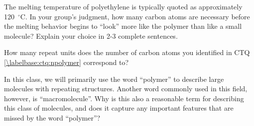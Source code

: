 \begin{activity}
\begin{ctqs}
	\question The melting temperature of polyethylene is typically quoted as approximately 120~${}^\circ$C.  In your group's judgment, how many carbon atoms are necessary before the melting behavior begins to ``look'' more like the polymer than like a small molecule?  Explain your choice in 2-3 complete sentences. \label{\labelbase:ctq:npolymer}
	
		\begin{solution}[2in]
		\end{solution}
	
	
			
\end{ctqs}

		

\begin{exercises}

	\exercise How many repeat units does the number of carbon atoms you identified in CTQ \ref{\labelbase:ctq:npolymer} correspond to?

	\exercise In this class, we will primarily use the word ``polymer'' to describe large molecules with repeating structures.  Another word commonly used in this field, however, is ``macromolecule''.  Why is this also a reasonable term for describing this class of molecules, and does it capture any important features that are missed by the word ``polymer''?
	
\end{exercises}



	


	
\end{activity}